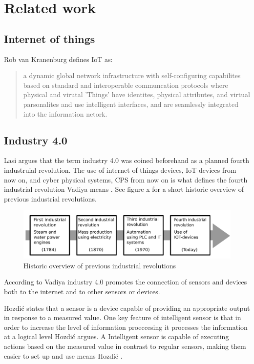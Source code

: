 \section{Related work}
\subsection{Internet of things}
Rob van Kranenburg defines IoT as:
\begin{quote}
    a dynamic global network infrastructure with self-configuring capabilites based on standard and interoperable communcation protocols where physical and virutal 'Things' have identites, physical attributes, and virtual parsonalites and use intelligent interfaces, and are seamlessly integrated into the information netork.  
\end{quote}

\subsection{Industry 4.0}
Lasi \cite{Lasi2014}  argues that the term industry 4.0 was coined beforehand as a planned fourth industruial revolution.
The use of internet of things devices, IoT-devices from now on, and cyber physical systems, CPS from now on is what defines the fourth industrial revolution Vadiya means \cite{Vaidya2018}.
See figure x for a short historic overview of previous industrial revolutions. 
\begin{figure}
    \centering
    \includegraphics[width=\textwidth]{Pictures/Industrial_revolution.pdf} 
    \caption{Historic overview of previous industrial revolutions}
    \label{Indutrial revolutions}
\end{figure}

According to Vadiya \cite{Vaidya2018} industry 4.0 promotes the connection of sensors and devices both to the internet and to other sensors or devices.


Hozdić \cite{Hozdic2015} states that a sensor is a device capable of providing an appropriate output in response to a measured value.
One key feature of intelligent sensor is that in order to increase the level of information proeccesing it processes the information at a logical level Hozdić \cite{Hozdic2015} argues.
A Intelligent sensor  is capable of executing actions based on the measured value in contrast to regular sensors, making them easier to set up and use means Hozdić \cite{Hozdic2015}.

